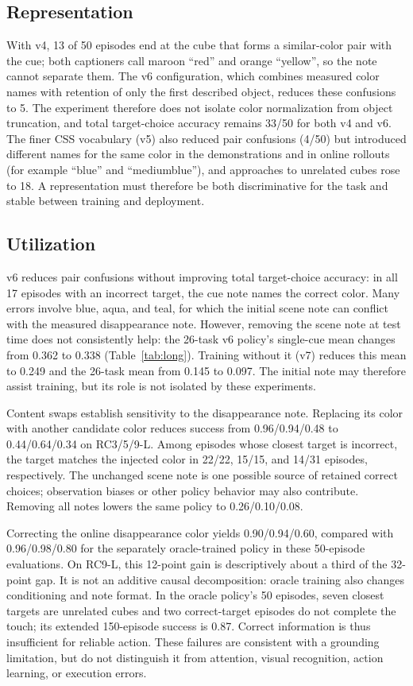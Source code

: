 \documentclass{IJCAS}
\begin{document}
\subsection{Representation}
With v4, 13 of 50 episodes end at the cube that forms a similar-color pair with the cue; both captioners call maroon ``red'' and orange ``yellow'', so the note cannot separate them.
The v6 configuration, which combines measured color names with retention of only the first described object, reduces these confusions to 5. The experiment therefore does not isolate color normalization from object truncation, and total target-choice accuracy remains 33/50 for both v4 and v6.
The finer CSS vocabulary (v5) also reduced pair confusions (4/50) but introduced different names for the same color in the demonstrations and in online rollouts (for example ``blue'' and ``mediumblue''), and approaches to unrelated cubes rose to 18.
A representation must therefore be both discriminative for the task and stable between training and deployment.

\subsection{Utilization}
v6 reduces pair confusions without improving total target-choice accuracy: in all 17 episodes with an incorrect target, the cue note names the correct color.
Many errors involve blue, aqua, and teal, for which the initial scene note can conflict with the measured disappearance note.
However, removing the scene note at test time does not consistently help: the 26-task v6 policy's single-cue mean changes from 0.362 to 0.338 (Table~\ref{tab:long}).
Training without it (v7) reduces this mean to 0.249 and the 26-task mean from 0.145 to 0.097.
The initial note may therefore assist training, but its role is not isolated by these experiments.

Content swaps establish sensitivity to the disappearance note.
Replacing its color with another candidate color reduces success from 0.96/0.94/0.48 to 0.44/0.64/0.34 on RC3/5/9-L.
Among episodes whose closest target is incorrect, the target matches the injected color in 22/22, 15/15, and 14/31 episodes, respectively.
The unchanged scene note is one possible source of retained correct choices; observation biases or other policy behavior may also contribute.
Removing all notes lowers the same policy to 0.26/0.10/0.08.

Correcting the online disappearance color yields 0.90/0.94/0.60, compared with 0.96/0.98/0.80 for the separately oracle-trained policy in these 50-episode evaluations.
On RC9-L, this 12-point gain is descriptively about a third of the 32-point gap.
It is not an additive causal decomposition: oracle training also changes conditioning and note format.
In the oracle policy's 50 episodes, seven closest targets are unrelated cubes and two correct-target episodes do not complete the touch; its extended 150-episode success is 0.87.
Correct information is thus insufficient for reliable action.
These failures are consistent with a grounding limitation, but do not distinguish it from attention, visual recognition, action learning, or execution errors.
\end{document}
